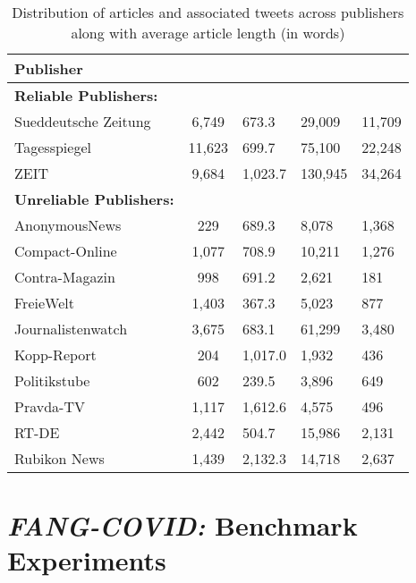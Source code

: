 \documentclass[11pt]{article}
\begin{document}
\begin{table*}[h!]
\centering
\caption{Distribution of articles and associated tweets across publishers along with average article length (in words)}
\begin{tabular}{lcatt}
\hline
\textbf{Publisher} &  \textbf{} & \textbf{} & \textbf{}& \textbf{}\\
\hline

\textbf{Reliable Publishers:} &&&\\
{Sueddeutsche Zeitung} & {6,749}  & {673.3} & {29,009} & 11,709 \\
{Tagesspiegel}& {11,623} & {699.7} & 75,100 & 22,248 \\ 
{ZEIT} & {9,684} & {1,023.7} & 130,945 & 34,264 \\
\hline
\textbf{Unreliable Publishers:} &&& \\
{AnonymousNews} & {229} & {689.3} & 8,078& 1,368  \\
{Compact-Online} & {1,077} & {708.9} & 10,211& 1,276 \\
{Contra-Magazin} & {998} &  {691.2} & 2,621 & 181\\ 
{FreieWelt} & {1,403} & {367.3} & 5,023 & 877  \\ 
{Journalistenwatch} & {3,675} & {683.1} & 61,299 & 3,480\\ 
{Kopp-Report} & {204} &  1,017.0 & 1,932 & 436\\ 
{Politikstube} & {602} &  {239.5} & 3,896 & 649 \\ 
{Pravda-TV} & {1,117} & {1,612.6} & 4,575 & 496 \\ 
{RT-DE} & {2,442} & {504.7} & 15,986 & 2,131 \\ 
{Rubikon News} & {1,439} & 2,132.3 & 14,718 & 2,637 \\ 

\hline
\end{tabular}
\label{tab:publishers}
\end{table*}




\section{\textit{FANG-COVID:} Benchmark Experiments}
\end{document}
